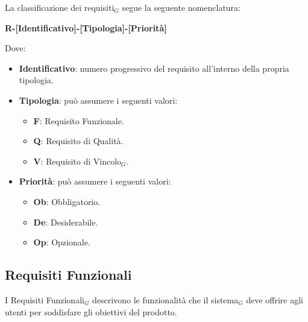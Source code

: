 \documentclass[a4paper, 10pt]{article}
\begin{document}
La classificazione dei requisiti$_G$ segue la seguente nomenclatura:

\begin{center}
    \textbf{R-[Identificativo]-[Tipologia]-[Priorità]}
\end{center}

Dove:
\begin{itemize}
    \item \textbf{Identificativo}: numero progressivo del requisito all'interno della propria tipologia.
    \item \textbf{Tipologia}: può assumere i seguenti valori:
    \begin{itemize}
        \item \textbf{F}: Requisito Funzionale.
        \item \textbf{Q}: Requisito di Qualità.
        \item \textbf{V}: Requisito di Vincolo$_G$.
    \end{itemize}
    \item \textbf{Priorità}: può assumere i seguenti valori:
    \begin{itemize}
        \item \textbf{Ob}: Obbligatorio.
        \item \textbf{De}: Desiderabile.
        \item \textbf{Op}: Opzionale.
    \end{itemize}
\end{itemize}

\subsection{Requisiti Funzionali}

I Requisiti Funzionali$_G$ descrivono le funzionalità che il sistema$_G$ deve offrire agli utenti per soddisfare gli obiettivi del prodotto.
\end{document}
